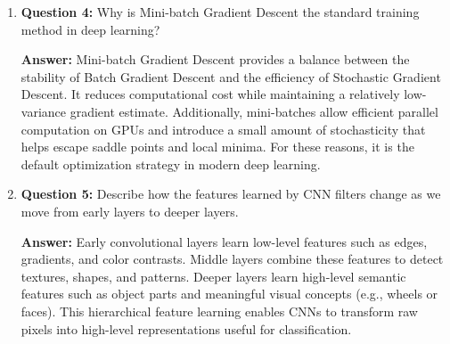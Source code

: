 \documentclass{article}
\begin{document}
\begin{enumerate}
    \item \textbf{Question 4:}
    \newline
    Why is Mini-batch Gradient Descent the standard training method in deep learning?
    
    \newline
    \textbf{Answer:}
    Mini-batch Gradient Descent provides a balance between the stability of Batch Gradient Descent and the efficiency of Stochastic Gradient Descent. It reduces computational cost while maintaining a relatively low-variance gradient estimate. Additionally, mini-batches allow efficient parallel computation on GPUs and introduce a small amount of stochasticity that helps escape saddle points and local minima. For these reasons, it is the default optimization strategy in modern deep learning.
    
    \item \textbf{Question 5:}
    \newline
    Describe how the features learned by CNN filters change as we move from early layers to deeper layers.
    
    \newline
    \textbf{Answer:}
    Early convolutional layers learn low-level features such as edges, gradients, and color contrasts. Middle layers combine these features to detect textures, shapes, and patterns. Deeper layers learn high-level semantic features such as object parts and meaningful visual concepts (e.g., wheels or faces). This hierarchical feature learning enables CNNs to transform raw pixels into high-level representations useful for classification.

\end{enumerate}
\end{document}
